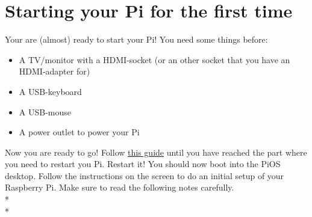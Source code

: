 \documentclass{article}
\begin{document}
\section{Starting your Pi for the first time}
Your are (almost) ready to start your Pi! You need some things before:
\begin{itemize}
    \item A TV/monitor with a HDMI-socket (or an other socket that you have an HDMI-adapter for)
    \item A USB-keyboard
    \item A USB-mouse
    \item A power outlet to power your Pi
\end{itemize}
Now you are ready to go!
Follow {\color{blue}\href{https://projects.raspberrypi.org/en/projects/raspberry-pi-setting-up/3}{this guide}} until you have reached the part where you need to restart you Pi. Restart it! You should now boot into the PiOS desktop. Follow the instructions on the screen to do an initial setup of your Raspberry Pi. Make sure to read the following notes carefully.\\*\\*
\end{document}
